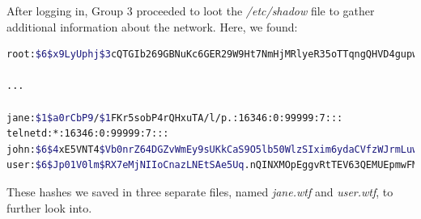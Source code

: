 
After logging in, Group 3 proceeded to loot the \textit{/etc/shadow} file to gather additional information about the network. Here, we found:



\lstset{extendedchars=\true}
\lstset{inputencoding=ansinew}

\begin{lstlisting}[language=bash,caption={/etc/shadow}]
root:$6$x9LyUphj$3cQTGIb269GBNuKc6GER29W9Ht7NmHjMRlyeR35oTTqngQHVD4gupwzSmjhAYOc6KEyfGQ32De27SgOCNzKcE.:16371:0:99999:7:::

...

jane:$1$a0rCbP9/$1FKr5sobP4rQHxuTA/l/p.:16346:0:99999:7:::
telnetd:*:16346:0:99999:7:::
john:$6$4xE5VNT4$Vb0nrZ64DGZvWmEy9sUKkCaS9O5lb50WlzSIxim6ydaCVfzWJrmLuwZIPxjgw1ZDIeQB9C9jX7qb7AtiDibjo0:16346:0:99999:7:::
user:$6$Jp01V0lm$RX7eMjNIIoCnazLNEtSAe5Uq.nQINXMOpEggvRtTEV63QEMUEpmwFMJhYzQtLT/M33Kbl5Mhr59tPJbvN/u4k1:16346:0:99999:7:::
\end{lstlisting}

These hashes we saved in three separate files, named \textit{jane.wtf} and \textit{user.wtf}, to further look into.

